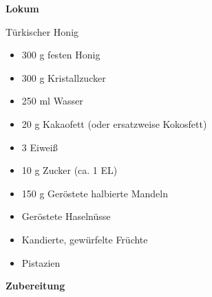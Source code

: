 
\parindent0pt	

\pagestyle{empty}


\textbf{{\LARGE Lokum}}%


\hrulefill

Türkischer Honig
\vspace*{\fill}
\begin{multicols}{2}	


\begin{itemize}
\item 300 g festen Honig
\item 300 g Kristallzucker
\item 250 ml Wasser
\item 20 g Kakaofett (oder ersatzweise Kokosfett)
\item 3 Eiweiß 
\item 10 g Zucker (ca. 1 EL)
\item 150 g Geröstete halbierte Mandeln
\item Geröstete Haselnüsse
\item Kandierte, gewürfelte Früchte
\item Pistazien

\end{itemize}

\end{multicols}
\vfill
\newpage
\textbf{{\LARGE Zubereitung}}%

\hrulefill

